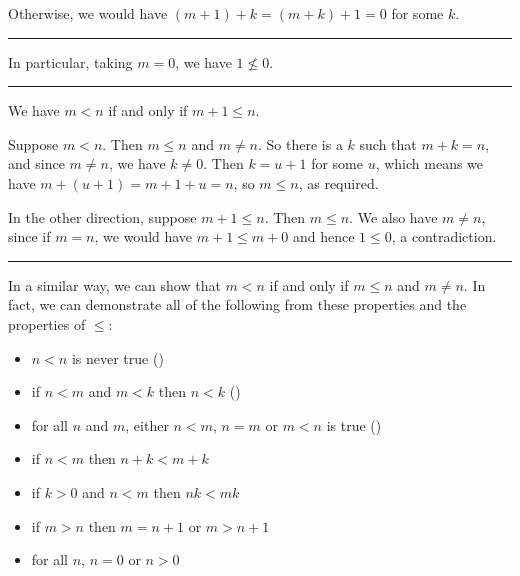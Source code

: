 \documentclass[letterpaper,10pt,english]{sphinxmanual}
\begin{document}
\sphinxAtStartPar
{} Otherwise, we would have \((m + 1) + k = (m + k) + 1 = 0\) for some \(k\).


\bigskip\hrule\bigskip


\sphinxAtStartPar
In particular, taking \(m = 0\), we have \(1 \not\le 0\).


\bigskip\hrule\bigskip


\sphinxAtStartPar
{} We have \(m < n\) if and only if \(m + 1 \le n\).

\sphinxAtStartPar
{} Suppose \(m < n\). Then \(m \le n\) and \(m \ne n\). So there is a \(k\) such that \(m + k = n\), and since \(m \ne n\), we have \(k \ne 0\). Then \(k = u + 1\) for some \(u\), which means we have \(m + (u + 1) = m + 1 + u = n\), so \(m \le n\), as required.

\sphinxAtStartPar
In the other direction, suppose \(m + 1 \le n\). Then \(m \le n\). We also have \(m \ne n\), since if \(m = n\), we would have \(m + 1 \le m + 0\) and hence \(1 \le 0\), a contradiction.


\bigskip\hrule\bigskip


\sphinxAtStartPar
In a similar way, we can show that \(m < n\) if and only if \(m \le n\) and \(m \ne n\). In fact, we can demonstrate all of the following from these properties and the properties of \(\le\):
\begin{itemize}
\item {} 
\sphinxAtStartPar
\(n < n\) is never true ()

\item {} 
\sphinxAtStartPar
if \(n < m\) and \(m < k\) then \(n < k\) ()

\item {} 
\sphinxAtStartPar
for all \(n\) and \(m\), either \(n < m\), \(n = m\) or \(m < n\) is true ()

\item {} 
\sphinxAtStartPar
if \(n < m\) then \(n + k < m + k\)

\item {} 
\sphinxAtStartPar
if \(k > 0\) and \(n < m\) then \(nk < mk\)

\item {} 
\sphinxAtStartPar
if \(m > n\) then \(m = n + 1\) or \(m > n + 1\)

\item {} 
\sphinxAtStartPar
for all \(n\), \(n = 0\) or \(n > 0\)

\end{itemize}
\end{document}
